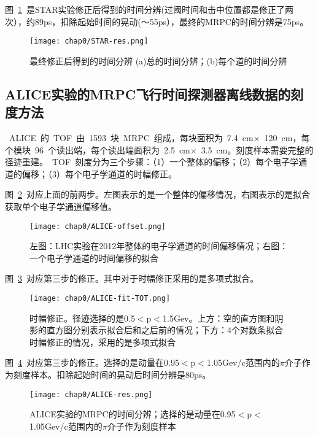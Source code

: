 图~\ref{fig:STAR-res}~是STAR实验修正后得到的时间分辨(过阈时间和击中位置都是修正了两次），约89ps，扣除起始时间的晃动(～55ps），最终的MRPC的时间分辨是75ps。
\begin{figure}[!h]
  \centering
  \texttt{[image: chap0/STAR-res.png]}
  \caption{最终修正后得到的时间分辨 (a)总的时间分辨；(b)每个道的时间分辨}
  \label{fig:STAR-res}
\end{figure}

\subsection{ALICE实验的MRPC飞行时间探测器离线数据的刻度方法}
~ALICE~的~TOF~由~1593~块~MRPC~组成，每块面积为~7.4~cm$\times$~120~cm，每个模块~96~个读出端，每个读出端面积为~2.5~cm$\times$~3.5~cm。刻度样本需要完整的径迹重建。~TOF~刻度分为三个步骤：（1）一个整体的偏移；（2）每个电子学通道的偏移；（3）每个电子学通道的时幅修正。

图~\ref{fig:ALICE-offset}~对应上面的前两步。左图表示的是一个整体的偏移情况，右图表示的是拟合获取单个电子学通道偏移值。
\begin{figure}[!h]
  \centering
  \texttt{[image: chap0/ALICE-offset.png]}
  \caption{左图：LHC实验在2012年整体的电子学通道的时间偏移情况；右图：一个电子学通道的时间偏移的拟合}
  \label{fig:ALICE-offset}
\end{figure}

图~\ref{fig:ALICE-fit-TOT}~对应第三步的修正。其中对于时幅修正采用的是多项式拟合。
\begin{figure}[!h]
  \centering
  \texttt{[image: chap0/ALICE-fit-TOT.png]}
  \caption{时幅修正。径迹选择的是0.5$<$p$<$1.5Gev。上方：空的直方图和阴影的直方图分别表示拟合后和之后前的情况；下方：4个对数条拟合时幅修正的情况，采用的是多项式拟合}
  \label{fig:ALICE-fit-TOT}
\end{figure}

图~\ref{fig:ALICE-res}~对应第三步的修正。选择的是动量在0.95$<$p$<$1.05Gev/c范围内的$\pi$介子作为刻度样本。扣除起始时间的晃动后时间分辨是80ps。
\begin{figure}[!h]
  \centering
  \texttt{[image: chap0/ALICE-res.png]}
  \caption{ALICE实验的MRPC的时间分辨；选择的是动量在0.95$<$p$<$1.05Gev/c范围内的$\pi$介子作为刻度样本}
  \label{fig:ALICE-res}
\end{figure}

